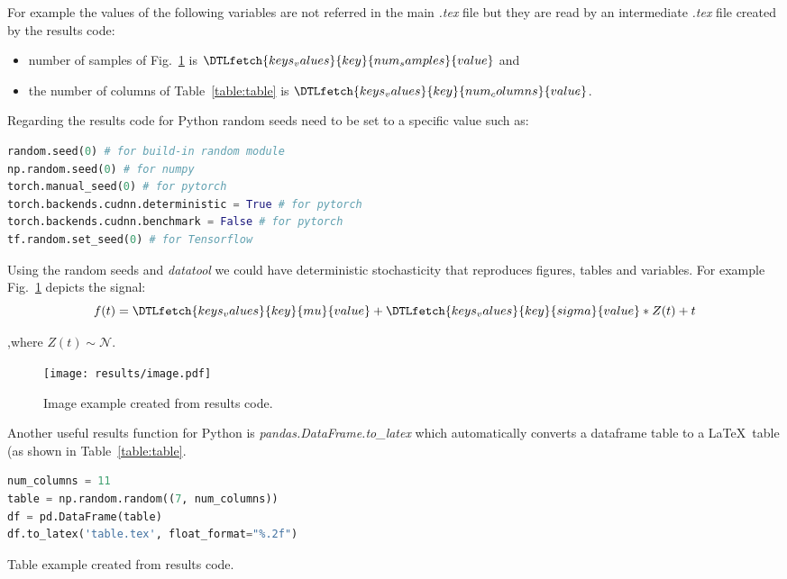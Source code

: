 \documentclass[journal]{IEEEtran}
\begin{document}
For example the values of the following variables are not referred in the main \textit{.tex} file but they are read by an intermediate \textit{.tex} file created by the results code:
\begin{itemize}
	\item number of samples of Fig.~\ref{fig:image} is $\DTLfetch{keys_values}{key}{num_samples}{value}$ and
	\item the number of columns of Table~\ref{table:table} is $\DTLfetch{keys_values}{key}{num_columns}{value}$.
\end{itemize}

Regarding the results code for Python random seeds need to be set to a specific value such as:
\begin{lstlisting}[language=python, style=lststyle, caption={Python reproducibility commands for some popular libraries.}, captionpos=b]
random.seed(0) # for build-in random module
np.random.seed(0) # for numpy
torch.manual_seed(0) # for pytorch
torch.backends.cudnn.deterministic = True # for pytorch
torch.backends.cudnn.benchmark = False # for pytorch
tf.random.set_seed(0) # for Tensorflow
\end{lstlisting}

Using the random seeds and \textit{datatool} we could have deterministic stochasticity that reproduces figures, tables and variables.
For example Fig.~\ref{fig:image} depicts the signal:
\begin{equation}
	f(t) = \DTLfetch{keys_values}{key}{mu}{value} + \DTLfetch{keys_values}{key}{sigma}{value} * Z(t) + t
\end{equation}

,where $Z(t)\sim\mathcal{N}$.

\begin{figure}[h]
	\texttt{[image: results/image.pdf]}
	\caption{Image example created from results code.}
	\label{fig:image}
\end{figure}

Another useful results function for Python is \textit{pandas.DataFrame.to\_latex} which automatically converts a dataframe table to a \LaTeX\ table (as shown in Table~\ref{table:table}.

\begin{lstlisting}[language=python, style=lststyle, caption={Convert Pandas DataFrame to \LaTeX\ table.}, captionpos=b]
num_columns = 11
table = np.random.random((7, num_columns))
df = pd.DataFrame(table)
df.to_latex('table.tex', float_format="%.2f")
\end{lstlisting}

\begin{table}[h]
	\centering
	\caption{Table example created from results code.}
	\label{table:table}
	\setlength\tabcolsep{4.2pt}
	
\end{table}



\end{document}
